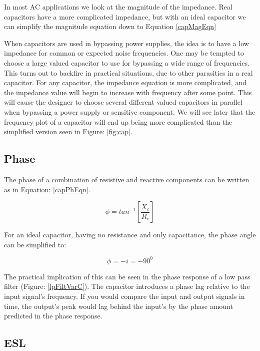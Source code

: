 In most AC applications we look at the magnitude of the impedance. Real capacitors have a more complicated impedance, but with an ideal capacitor we can simplify the magnitude equation down to Equation \eqref{capMagEqn}

When capacitors are used in bypassing power supplies, the idea is to have a low impedance for common or expected noise frequencies. One may be tempted to choose a large valued capacitor to use for bypassing a wide range of frequencies. This turns out to backfire in practical situations, due to other parasitics in a real capacitor. For any capacitor, the impedance equation is more complicated, and the impedance value will begin to increase with frequency after some point. This will cause the designer to choose several different valued capacitors in parallel when bypassing a power supply or sensitive component. We will see later that the frequency plot of a capacitor will end up being more complicated than the simplified version seen in Figure: \ref{fig:cap}.



\subsection{Phase}

The phase of a combination of resistive and reactive components can be written as in Equation: \eqref{capPhEqn}.

\begin{equation}
\label{capPhEqn}
\phi = tan^{-1}[\frac{X_c}{R_c}]
\end{equation}

For an ideal capacitor, having no resistance and only capacitance, the phase angle can be simplified to:

\begin{equation}
\label{capImpEqu2}
\phi = -i = -90^0
\end{equation}

The practical implication of this can be seen in the phase response of a low pass filter (Figure: \ref{lpFiltVarC}). The capacitor introduces a phase lag relative to the input signal's frequency. If you would compare the input and output signals in time, the output's peak would lag behind the input's by the phase amount predicted in the phase response.


\subsection{ESL}

